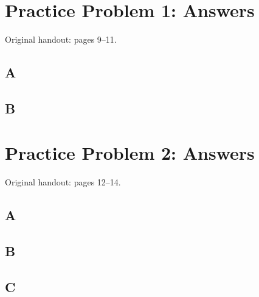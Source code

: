 \documentclass[letterpaper,12pt]{article}
\newcommand{\handout}[1]{%
  
}
\newenvironment{answer}{\par}{\par\medskip}
\begin{document}
\clearpage

\handout{9-11}
\section*{Practice Problem 1: Answers}
\noindent Original handout: pages 9--11.\par

\subsection*{A}
\begin{answer}
  \vspace{2cm}
\end{answer}

\subsection*{B}
\begin{answer}
  \vspace{2cm}
\end{answer}

\clearpage

\handout{12-14}
\section*{Practice Problem 2: Answers}
\noindent Original handout: pages 12--14.\par

\subsection*{A}
\begin{answer}
  \vspace{2cm}
\end{answer}

\subsection*{B}
\begin{answer}
  \vspace{2cm}
\end{answer}

\subsection*{C}
\begin{answer}
  \vspace{2cm}
\end{answer}
\end{document}
